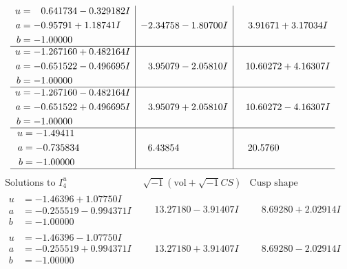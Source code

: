 \documentclass[1p]{elsarticle_modified}
\theoremstyle{definition}
\newcommand{\I}{\sqrt{-1}}
\begin{document}
$$\begin{array}{c|c|c}
\begin{aligned}
u &= \phantom{-}0.641734 - 0.329182 I \\
a &= -0.95791 + 1.18741 I \\
b &= -1.00000\phantom{ +0.000000I}\end{aligned}
 & -2.34758 - 1.80700 I & \phantom{-}3.91671 + 3.17034 I \\ \hline\begin{aligned}
u &= -1.267160 + 0.482164 I \\
a &= -0.651522 - 0.496695 I \\
b &= -1.00000\phantom{ +0.000000I}\end{aligned}
 & \phantom{-}3.95079 - 2.05810 I & \phantom{-}10.60272 + 4.16307 I \\ \hline\begin{aligned}
u &= -1.267160 - 0.482164 I \\
a &= -0.651522 + 0.496695 I \\
b &= -1.00000\phantom{ +0.000000I}\end{aligned}
 & \phantom{-}3.95079 + 2.05810 I & \phantom{-}10.60272 - 4.16307 I \\ \hline\begin{aligned}
u &= -1.49411\phantom{ +0.000000I} \\
a &= -0.735834\phantom{ +0.000000I} \\
b &= -1.00000\phantom{ +0.000000I}\end{aligned}
 & \phantom{-}6.43854\phantom{ +0.000000I} & \phantom{-}20.5760\phantom{ +0.000000I}\\
 \hline 
 \end{array}$$\newpage$$\begin{array}{c|c|c}  
\text{Solutions to }I^u_{4}& \I (\text{vol} + \sqrt{-1}CS) & \text{Cusp shape}\\
 \hline 
\begin{aligned}
u &= -1.46396 + 1.07750 I \\
a &= -0.255519 - 0.994371 I \\
b &= -1.00000\phantom{ +0.000000I}\end{aligned}
 & \phantom{-}13.27180 - 3.91407 I & \phantom{-}8.69280 + 2.02914 I \\ \hline\begin{aligned}
u &= -1.46396 - 1.07750 I \\
a &= -0.255519 + 0.994371 I \\
b &= -1.00000\phantom{ +0.000000I}\end{aligned}
 & \phantom{-}13.27180 + 3.91407 I & \phantom{-}8.69280 - 2.02914 I \\ \hline\begin{aligned}

\end{aligned}
\end{array}$$
\end{document}

